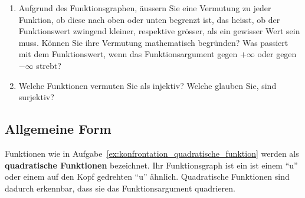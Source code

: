 \documentclass[12pt]{article}
\begin{document}
\begin{exercise}
\begin{enumerate}[label=\alph*)]
\item Aufgrund des Funktionsgraphen, äussern Sie eine Vermutung zu jeder Funktion, ob diese nach oben oder unten begrenzt ist, das heisst, ob der Funktionswert zwingend kleiner, respektive grösser, als ein gewisser Wert sein muss. Können Sie ihre Vermutung mathematisch begründen? Was passiert mit dem Funktionswert, wenn das Funktionsargument gegen $+\infty$ oder gegen $-\infty$ strebt?
\item Welche Funktionen vermuten Sie als injektiv? Welche glauben Sie, sind surjektiv?
\end{enumerate}
\end{exercise}


\subsection{Allgemeine Form}
Funktionen wie in Aufgabe~\ref{ex:konfrontation_quadratische_funktion} werden als \textbf{quadratische Funktionen} bezeichnet. Ihr Funktionsgraph ist ein ist einem ``u'' oder einem auf den Kopf gedrehten ``u'' ähnlich. Quadratische Funktionen sind dadurch erkennbar, dass sie das Funktionsargument quadrieren.
\end{document}
